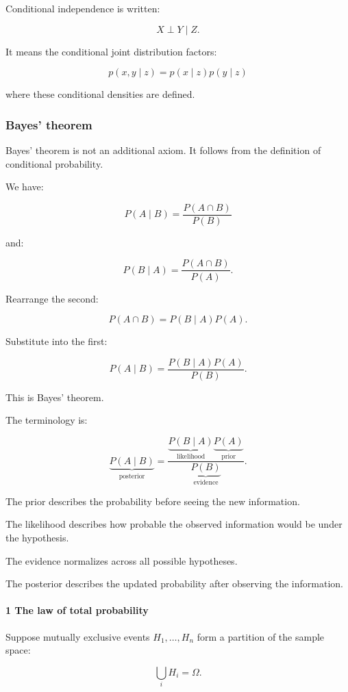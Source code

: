 Conditional independence is written:

\[
 X\perp Y\mid Z.
\]

It means the conditional joint distribution factors:

\[
 p(x,y\mid z)=p(x\mid z)p(y\mid z)
\]

where these conditional densities are defined.

\subsubsection{Bayes' theorem}\label{bayes-theorem}

Bayes' theorem is not an additional axiom. It follows from the definition of conditional probability.

We have:

\[
 P(A\mid B)=\frac{P(A\cap B)}{P(B)}
\]

and:

\[
 P(B\mid A)=\frac{P(A\cap B)}{P(A)}.
\]

Rearrange the second:

\[
 P(A\cap B)=P(B\mid A)P(A).
\]

Substitute into the first:

\[
 \boxed{ P(A\mid B) = \frac{P(B\mid A)P(A)}{P(B)} }.
\]

This is Bayes' theorem.

The terminology is:

\[
 \underbrace{P(A\mid B)}_{\text{posterior}} = \frac{ \underbrace{P(B\mid A)}_{\text{likelihood}} \underbrace{P(A)}_{\text{prior}} }{ \underbrace{P(B)}_{\text{evidence}} }.
\]

The prior describes the probability before seeing the new information.

The likelihood describes how probable the observed information would be under the hypothesis.

The evidence normalizes across all possible hypotheses.

The posterior describes the updated probability after observing the information.

\paragraph{1 The law of total probability}\label{the-law-of-total-probability}

Suppose mutually exclusive events \(H_1,\ldots,H_n\) form a partition of the sample space:

\[
 \bigcup_iH_i=\Omega.
\]

